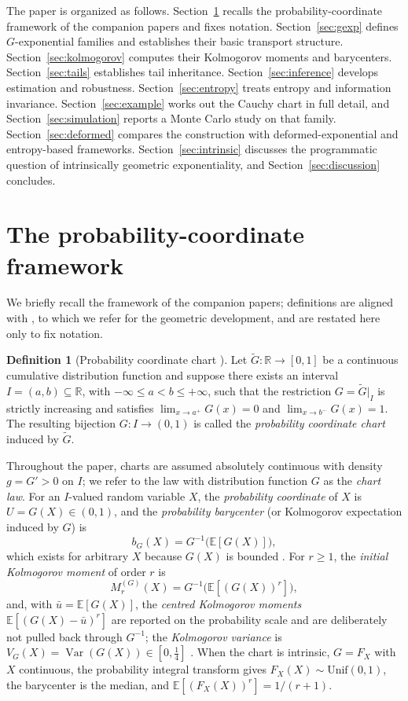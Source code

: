 \documentclass[11pt]{article}
\theoremstyle{definition}
\newtheorem{definition}[theorem]{Definition}
\newcommand{\E}{\mathbb{E}}
\newcommand{\R}{\mathbb{R}}
\newcommand{\Var}{\operatorname{Var}}
\newcommand{\Unif}{\mathrm{Unif}}
\begin{document}
The paper is organized as follows. Section~\ref{sec:framework} recalls the
probability-coordinate framework of the companion papers and fixes
notation. Section~\ref{sec:gexp} defines $G$-exponential families and
establishes their basic transport structure. Section~\ref{sec:kolmogorov}
computes their Kolmogorov moments and barycenters.
Section~\ref{sec:tails} establishes tail inheritance.
Section~\ref{sec:inference} develops estimation and robustness.
Section~\ref{sec:entropy} treats entropy and information invariance.
Section~\ref{sec:example} works out the Cauchy chart in full detail, and
Section~\ref{sec:simulation} reports a Monte Carlo study on that family.
Section~\ref{sec:deformed} compares the construction with
deformed-exponential and entropy-based frameworks.
Section~\ref{sec:intrinsic} discusses the programmatic question of
intrinsically geometric exponentiality, and
Section~\ref{sec:discussion} concludes.

\section{The probability-coordinate framework}\label{sec:framework}

We briefly recall the framework of the companion papers; definitions are
aligned with \cite{Cojocea2026a}, to which we refer for the geometric
development, and are restated here only to fix notation.

\begin{definition}[Probability coordinate chart \cite{Cojocea2026a}]
\label{def:chart}
Let $\widetilde G:\R\to[0,1]$ be a continuous cumulative distribution
function and suppose there exists an interval $I=(a,b)\subseteq\R$, with
$-\infty\le a<b\le+\infty$, such that the restriction
$G=\widetilde G|_I$ is strictly increasing and satisfies
$\lim_{x\to a^+}G(x)=0$ and $\lim_{x\to b^-}G(x)=1$. The resulting
bijection $G:I\to(0,1)$ is called the \emph{probability coordinate chart}
induced by $\widetilde G$.
\end{definition}

Throughout the paper, charts are assumed absolutely continuous with
density $g=G'>0$ on $I$; we refer to the law with distribution function
$G$ as the \emph{chart law}. For an $I$-valued random variable $X$, the
\emph{probability coordinate} of $X$ is $U=G(X)\in(0,1)$, and the
\emph{probability barycenter} (or Kolmogorov expectation induced by $G$)
is
\[
b_G(X)=G^{-1}\bigl(\E[G(X)]\bigr),
\]
which exists for arbitrary $X$ because $G(X)$ is bounded
\cite{Cojocea2026a}. For $r\ge1$, the \emph{initial Kolmogorov moment} of
order $r$ is
\begin{equation}\label{eq:initial-moment}
M_r^{(G)}(X)=G^{-1}\bigl(\E[(G(X))^r]\bigr),
\end{equation}
and, with $\bar u=\E[G(X)]$, the \emph{centred Kolmogorov moments}
$\E[(G(X)-\bar u)^r]$ are reported on the probability scale and are
deliberately not pulled back through $G^{-1}$; the \emph{Kolmogorov
variance} is $V_G(X)=\Var(G(X))\in[0,\tfrac14]$
\cite{Cojocea2026a}. When the chart is intrinsic, $G=F_X$ with $X$
continuous, the probability integral transform gives
$F_X(X)\sim\Unif(0,1)$, the barycenter is the median, and
$\E[(F_X(X))^r]=1/(r+1)$.
\end{document}
